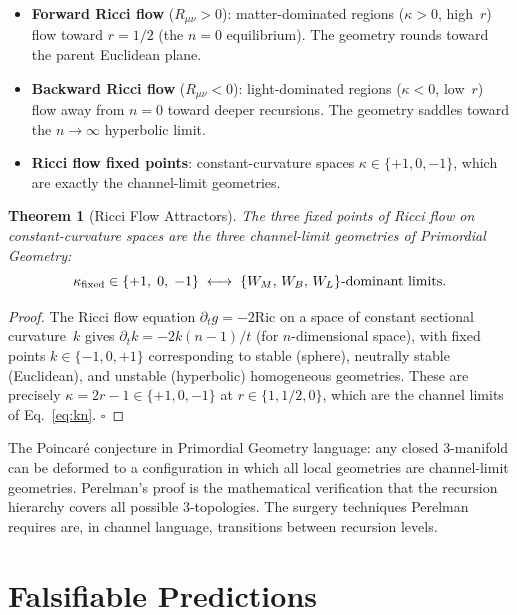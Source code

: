 \documentclass[prd,twocolumn,preprintnumbers,amsmath,amssymb]{revtex4-2}
\newtheorem{theorem}{Theorem}
\newcommand{\WL}{W_{L}}
\newcommand{\WB}{W_{B}}
\newcommand{\WM}{W_{M}}
\begin{document}
\begin{itemize}
  \item \textbf{Forward Ricci flow} ($R_{\mu\nu}>0$): matter-dominated regions
        ($\kappa > 0$, high~$r$) flow toward $r = 1/2$ (the $n=0$ equilibrium).
        The geometry rounds toward the parent Euclidean plane.

  \item \textbf{Backward Ricci flow} ($R_{\mu\nu}<0$): light-dominated regions
        ($\kappa < 0$, low~$r$) flow away from $n=0$ toward deeper recursions.
        The geometry saddles toward the $n\to\infty$ hyperbolic limit.

  \item \textbf{Ricci flow fixed points}: constant-curvature spaces $\kappa\in
        \{+1, 0, -1\}$, which are exactly the channel-limit geometries.
\end{itemize}

\begin{theorem}[Ricci Flow Attractors]
The three fixed points of Ricci flow on constant-curvature spaces are the three
channel-limit geometries of Primordial Geometry:
\begin{equation}
  \kappa_{\rm fixed} \in \{+1,\;0,\;-1\}
  \;\longleftrightarrow\;
  \{\WM,\,\WB,\,\WL\}\text{-dominant limits.}
\end{equation}
\end{theorem}
\begin{proof}
The Ricci flow equation $\partial_t g = -2\mathrm{Ric}$ on a space of constant
sectional curvature~$k$ gives $\partial_t k = -2k(n-1)/t$ (for $n$-dimensional
space), with fixed points $k\in\{-1, 0, +1\}$ corresponding to stable
(sphere), neutrally stable (Euclidean), and unstable (hyperbolic) homogeneous
geometries.  These are precisely $\kappa = 2r-1 \in \{+1, 0, -1\}$ at $r\in
\{1, 1/2, 0\}$, which are the channel limits of Eq.~\eqref{eq:kn}.
\hfill$\square$
\end{proof}

The Poincaré conjecture in Primordial Geometry language: any closed 3-manifold can
be deformed to a configuration in which all local geometries are channel-limit
geometries.  Perelman's proof is the mathematical verification that the recursion
hierarchy covers all possible 3-topologies.  The surgery techniques Perelman
requires are, in channel language, transitions between recursion levels.

\section{Falsifiable Predictions}
\label{sec:falsify}
\end{document}

